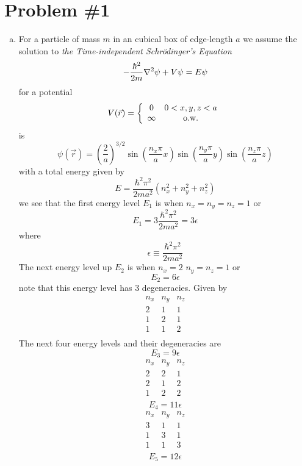 \documentclass[11pt]{article}
\numberwithin{equation}{section}
\newcommand{\grad}{\bold\nabla}
\begin{document}


\section{Problem \#1}
\begin{enumerate}[(a)]
\item
For a particle of mass $m$ in an cubical box of edge-length $a$ we assume the solution to \emph{the Time-independent Schr\"{o}dinger's Equation}
\begin{equation}
-\frac{\hbar^2}{2m}\grad^2\psi+V\psi=E\psi
\label{Schro}
\end{equation}
for a potential 
$$V(\vec{r}) = \left\{\begin{array}{cc}
0	&0<x,y,z<a\\
\infty	&\textnormal{o.w.}
\end{array}\right.$$
is 
$$\psi(\vec{r}) = \left(\frac{2}{a}\right)^{3/2}\sin\left(\frac{n_x\pi}{a}x\right)\sin\left(\frac{n_y\pi}{a}y\right)\sin\left(\frac{n_z\pi}{a}z\right)$$
with a total energy given by
$$E = \frac{\hbar^2\pi^2}{2ma^2}(n_x^2+n_y^2+n_z^2)$$
we see that the first energy level $E_1$ is when $n_x=n_y=n_z=1$ or 
$$E_1 = 3\frac{\hbar^2\pi^2}{2ma^2} = 3\epsilon$$
where 
$$\epsilon\equiv\frac{\hbar^2\pi^2}{2ma^2}$$
The next energy level up $E_2$ is when $n_x=2$ $n_y=n_z=1$ or 
$$E_2 = 6\epsilon$$
note that this energy level has 3 degeneracies. Given by
$$\begin{array}{ccc}
n_x	&n_y	&n_z	\\
2	&1	&1	\\
1	&2	&1	\\
1	&1	&2	\\
\end{array}$$
The next four energy levels and their degeneracies are
$$E_3 = 9\epsilon$$
$$\begin{array}{ccc}
n_x	&n_y	&n_z	\\
2	&2	&1	\\
2	&1	&2	\\
1	&2	&2	\\
\end{array}$$
$$E_4 = 11\epsilon$$
$$\begin{array}{ccc}
n_x	&n_y	&n_z	\\
3	&1	&1	\\
1	&3	&1	\\
1	&1	&3	\\
\end{array}$$
$$E_5 = 12\epsilon$$
$$\begin{array}{ccc}

\end{array}$$
\end{enumerate}
\end{document}
